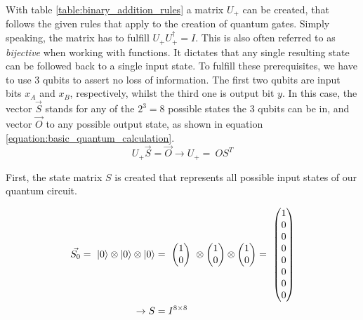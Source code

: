 With table \ref{table:binary_addition_rules} a matrix $U_{+}$ can be created, that follows the given rules that apply to the creation of quantum gates\cite{scherer_quantum_2019}. Simply speaking, the matrix has to fulfill $U_{+}U_{+}^\dagger = I$. This is also often referred to as \emph{bijective} when working with functions. It dictates that any single resulting state can be followed back to a single input state. To fulfill these prerequisites, we have to use 3 qubits to assert no loss of information. The first two qubits are input bits $x_A$ and $x_B$, respectively, whilst the third one is output bit $y$. In this case, the vector $\vec{S}$ stands for any of the $2^3 = 8$ possible states the 3 qubits can be in, and vector $\vec{O}$ to any possible output state, as shown in equation \ref{equation:basic_quantum_calculation}.\\

\begin{equation}
    U_{+}\vec{S} = \vec{O} \rightarrow U_{+} =\ OS^T
    \label{equation:basic_quantum_calculation}
\end{equation}

First, the state matrix $S$ is created that represents all possible input states of our quantum circuit.

\begin{equation}
    \begin{split}
        \vec{S_0} =\ \ket{0} \otimes \ket{0} \otimes \ket{0} &=\ \begin{pmatrix} 1 \\ 0\end{pmatrix}\ \otimes \begin{pmatrix}1 \\ 0\end{pmatrix} \otimes \begin{pmatrix}1 \\ 0\end{pmatrix} =\ \begin{pmatrix}1 \\0 \\0 \\0 \\0 \\0 \\0 \\0 \end{pmatrix}\\
        \rightarrow S &= I^{8\times8}
    \end{split}
    \label{equation:state_matrix_is_identity_matrix}
\end{equation}

